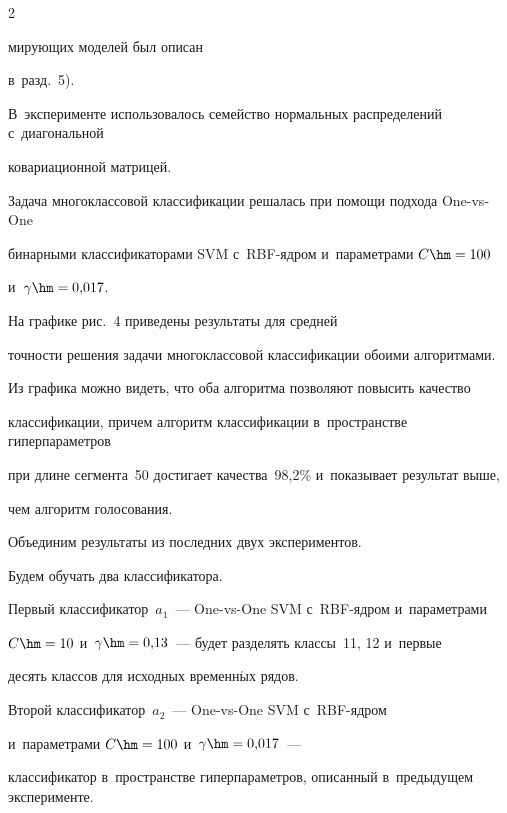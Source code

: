 \begin{multicols}{2}





\noindent


мирующих моделей был описан 


в~разд.~5).


В~эксперименте использовалось семейство нормальных распреде\-лений с~диагональной 


ковариационной мат\-рицей.





Задача многоклассовой классификации решалась при помощи подхода One-vs-One 


бинарными классификаторами SVM с~RBF-яд\-ром и~параметрами $C\hm=100$


и~$\gamma\hm=0{,}017$.





На графике рис.~4 приведены результаты для средней 


точности решения задачи многоклассовой классификации обоими алгоритмами.





Из графика можно видеть, что оба алгоритма позволяют повысить качество 


классификации, причем алгоритм классификации в~пространстве гиперпараметров 


при длине сегмента~50 достигает качества~98,2\% и~показывает результат выше, 


чем алгоритм голосования.





Объединим результаты из последних двух экспериментов.


Будем обучать два классификатора.


Первый классификатор~$a_1$~--- One-vs-One SVM с~RBF-яд\-ром и~параметрами


$C\hm=10$ и~$\gamma\hm=0{,}13$~--- будет разделять классы~11, 12 и~первые 


десять классов для исходных временн$\acute{\mbox{ы}}$х рядов.


Второй классификатор~$a_2$~--- One-vs-One SVM с~RBF-яд\-ром 


и~параметрами $C\hm=100$ и~$\gamma\hm=0{,}017$~--- 


классификатор в~пространстве гиперпараметров, описанный в~предыду\-щем эксперименте.






\end{multicols}
